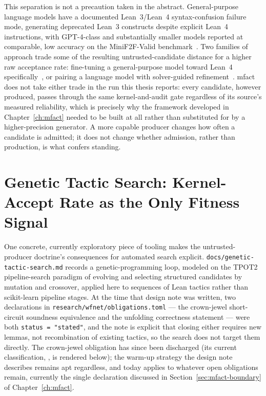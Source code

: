 This separation is not a precaution taken in the abstract. General-purpose
language models have a documented Lean~3/Lean~4 syntax-confusion failure
mode, generating deprecated Lean~3 constructs despite explicit Lean~4
instructions, with GPT-4-class and substantially smaller models reported
at comparable, low accuracy on the MiniF2F-Valid
benchmark~\cite{langconfusion2025}. Two families of approach trade some
of the resulting untrusted-candidate distance for a higher raw acceptance
rate: fine-tuning a general-purpose model toward Lean~4
specifically~\cite{theoremllama2024}, or pairing a language model with
solver-guided refinement~\cite{apollo2025}. \textsf{mfact} does not take
either trade in the run this thesis reports: every candidate, however
produced, passes through the same kernel-and-audit gate regardless of
its source's measured reliability, which is precisely why the framework
developed in Chapter~\ref{ch:mfact} needed to be built at all rather than
substituted for by a higher-precision generator. A more capable producer
changes how often a candidate is admitted; it does not change whether
admission, rather than production, is what confers standing.

\section{Genetic Tactic Search: Kernel-Accept Rate as the Only Fitness Signal}
\label{sec:ai-genetic-search}

One concrete, currently exploratory piece of tooling makes the
untrusted-producer doctrine's consequences for automated search
explicit. \texttt{docs/genetic-tactic-search.md} records a
genetic-programming loop, modeled on the TPOT2 pipeline-search paradigm
of evolving and selecting structured candidates by mutation and
crossover, applied here to sequences of Lean tactics rather than
scikit-learn pipeline stages. At the time that design note was written,
two declarations in \texttt{research/wfnet/obligations.toml} --- the
crown-jewel short-circuit soundness equivalence and the unfolding
correctness statement --- were both \texttt{status = "stated"}, and the
note is explicit that closing either requires new lemmas, not
recombination of existing tactics, so the search does not target them
directly. The crown-jewel obligation has since been discharged (its
current classification, \CrownJewelStatus, is rendered below); the
warm-up strategy the design note describes remains apt regardless, and
today applies to whatever open obligations remain, currently the single
declaration discussed in
Section~\ref{sec:mfact-boundary} of Chapter~\ref{ch:mfact}.

